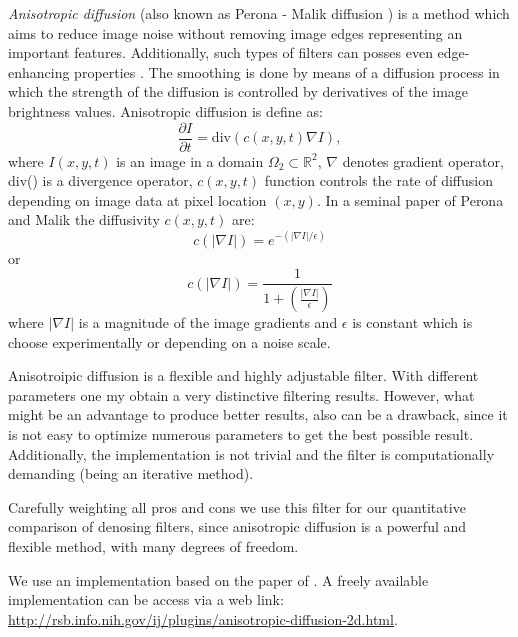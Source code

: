 \textit{Anisotropic diffusion} (also known as Perona - Malik diffusion \cite{Perona90}) is a method which aims to reduce image noise without removing image edges representing an important features. Additionally, such types of filters can posses even edge-enhancing properties \cite{Weickert98}. The smoothing is done by means of a diffusion process in which the strength of the diffusion is controlled by derivatives of the image brightness values.
Anisotropic diffusion is define as:
$$ \frac{\partial I}{\partial t} = \text{div} ( c(x,y,t) \nabla I),$$
where $I(x,y,t)$ is an image in a domain $ \Omega_{2} \subset \mathbb{R}^2$, $\nabla$ denotes gradient operator, div() is a divergence operator, $c(x,y,t)$ function controls the rate of diffusion depending on image data at pixel location $(x,y)$.
In a seminal paper of Perona and Malik the diffusivity $c(x,y,t)$ are:
$$c(|\nabla I|) = e^{-(|\nabla I| / \epsilon)}$$
or
$$c(|\nabla I|) = \frac{1}{1 + (\frac{|\nabla I|}{\epsilon})}$$
where $|\nabla I|$ is a magnitude of the image gradients and $\epsilon$ is constant which is choose experimentally or depending on a noise scale.

Anisotroipic diffusion is a flexible and highly adjustable filter. With different parameters one my obtain a very distinctive filtering results. However, what might be an advantage to produce better results, also can be a drawback, since it is not easy to optimize numerous parameters to get the best possible result. Additionally, the implementation is not trivial and the filter is computationally demanding (being an iterative method). 

Carefully weighting all pros and cons we use this filter for our quantitative comparison of denosing filters, since anisotropic diffusion is a powerful and flexible method, with many degrees of freedom. 

We use an implementation based on the paper of \cite{Tschumperle05}. A freely available implementation can be access via a web link: \\
\url{http://rsb.info.nih.gov/ij/plugins/anisotropic-diffusion-2d.html}.  




\newcommand{\imageSize}{0.65}

